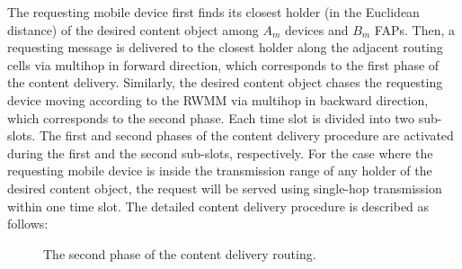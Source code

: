 \documentclass[10pt,journal,compsoc,onecolumn]{IEEEtran}
\begin{document}
The requesting mobile device first finds its closest holder (in the
Euclidean distance) of the desired content object among $A_m$
devices and $B_m$ FAPs. Then, a requesting message is delivered to
the closest holder along the adjacent routing cells via multihop
in forward direction, which corresponds to the first phase of the
content delivery. Similarly, the desired content object chases the
requesting device moving according to the RWMM via multihop in
backward direction, which corresponds to the second phase. Each
time slot is divided into two sub-slots. The first and second
phases of the content delivery procedure are activated during the
first and the second sub-slots, respectively. For the case where
the requesting mobile device is inside the transmission range of any holder
of the desired content object, the request will be served using
single-hop transmission within one time slot.
The detailed content delivery
procedure is described as follows:
\begin{figure*}[t!]
    \centering
    \caption{\small{The second phase of the content delivery routing.}}
    \label{2}
\end{figure*}
\end{document}
